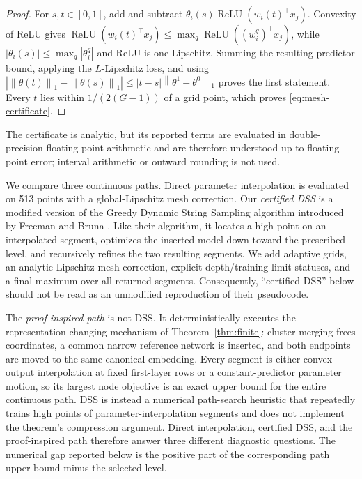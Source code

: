 \documentclass[pdflatex,sn-mathphys-num]{sn-jnl}
\theoremstyle{thmstyleone}
\theoremstyle{thmstyletwo}
\theoremstyle{thmstylethree}
\newcommand{\relu}{\operatorname{ReLU}}
\newcommand{\norm}[1]{\left\lVert #1 \right\rVert}
\newcommand{\abs}[1]{\left\lvert #1 \right\rvert}
\begin{document}
\begin{proof}
For $s,t\in[0,1]$, add and subtract
$\theta_i(s)\relu(w_i(t)^\top x_j)$. Convexity of ReLU gives
$\relu(w_i(t)^\top x_j)\le\max_q\relu((w_i^q)^\top x_j)$, while
$\abs{\theta_i(s)}\le\max_q\abs{\theta_i^q}$ and ReLU is one-Lipschitz. Summing the resulting predictor bound, applying the $L$-Lipschitz loss, and using
$\abs{\norm{\theta(t)}_1-\norm{\theta(s)}_1}\le\abs{t-s}\norm{\theta^1-\theta^0}_1$
proves the first statement. Every $t$ lies within $1/(2(G-1))$ of a grid point, which proves \eqref{eq:mesh-certificate}.
\end{proof}

The certificate is analytic, but its reported terms are evaluated in double-precision floating-point arithmetic and are therefore understood up to floating-point error; interval arithmetic or outward rounding is not used.

We compare three continuous paths. Direct parameter interpolation is evaluated on 513 points with a global-Lipschitz mesh correction. Our \emph{certified DSS} is a modified version of the Greedy Dynamic String Sampling algorithm introduced by Freeman and Bruna \cite{FreemanBruna2017}. Like their algorithm, it locates a high point on an interpolated segment, optimizes the inserted model down toward the prescribed level, and recursively refines the two resulting segments. We add adaptive grids, an analytic Lipschitz mesh correction, explicit depth/training-limit statuses, and a final maximum over all returned segments. Consequently, ``certified DSS'' below should not be read as an unmodified reproduction of their pseudocode.

The \emph{proof-inspired path} is not DSS. It deterministically executes the representation-changing mechanism of Theorem~\ref{thm:finite}: cluster merging frees coordinates, a common narrow reference network is inserted, and both endpoints are moved to the same canonical embedding. Every segment is either convex output interpolation at fixed first-layer rows or a constant-predictor parameter motion, so its largest node objective is an exact upper bound for the entire continuous path. DSS is instead a numerical path-search heuristic that repeatedly trains high points of parameter-interpolation segments and does not implement the theorem's compression argument. Direct interpolation, certified DSS, and the proof-inspired path therefore answer three different diagnostic questions. The numerical gap reported below is the positive part of the corresponding path upper bound minus the selected level.
\end{document}
